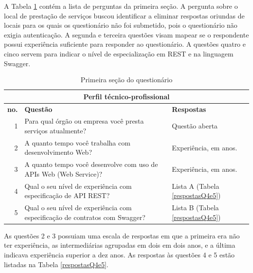 A Tabela \ref{Secao1Questionario} contém a lista de perguntas da primeira seção.
A pergunta sobre o local de prestação de serviços buscou identificar a eliminar
respostas oriundas de locais para os quais os questionário não foi submetido,
pois o questionário não exigia autenticação. A segunda e terceira questões visam
mapear se o respondente possui experiência suficiente para responder ao
questionário. A questões quatro e cinco servem para indicar o nível de
especialização em \wss{} REST e na linguagem Swagger.

\begin{table}[h]
\centering
\vspace{0.5cm}
\begin{tabular}{r|p{9cm}|p{4cm}}
\multicolumn{3}{c}{Perfil técnico-profissional}\\
\hline    
\textbf{no.} & \textbf{Questão} & \textbf{Respostas} \\
\hline    
1 & Para qual órgão ou empresa você presta serviços atualmente? & Questão aberta
\\
2 & A quanto tempo você trabalha com desenvolvimento Web? & Experiência, em
anos.\\
3 & A quanto tempo você desenvolve com uso de APIs Web (Web Service)? & Experiência, em
anos.\\
4 & Qual o seu nível de experiência com especificação de API REST? & Lista A
(Tabela \ref{respostasQ4e5}) \\
5 & Qual o seu nível de experiência com especificação de contratos com Swagger?
& Lista B (Tabela \ref{respostasQ4e5})\\

\end{tabular}
\caption{Primeira seção do questionário}
\label{Secao1Questionario}
\end{table}

As questões 2 e 3 possuiam uma escala de respostas em que a primeira era
não ter experiência, as intermediárias agrupadas em dois em dois
anos, e a última indicava experiência superior a dez anos. As respostas às
questões 4 e 5 estão listadas na Tabela \ref{respostasQ4e5}.

